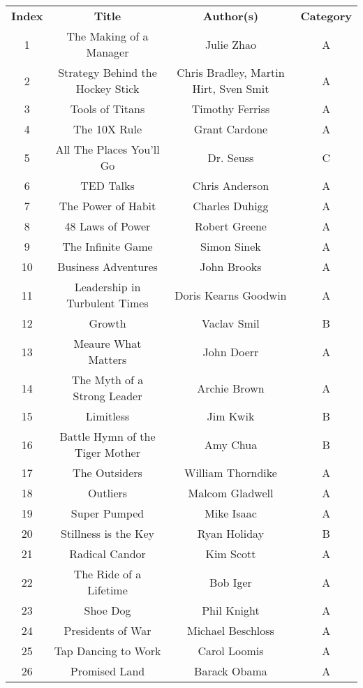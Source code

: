 \documentclass[11pt, letterpaper]{article}
\begin{document}
\begin{center}
    \begin{tabular}{ c c c c }
        \textbf{Index} & \textbf{Title} & \textbf{Author(s)} & \textbf{Category} \\ 
        1 & The Making of a Manager & Julie Zhao &  A \\  
        2 & Strategy Behind the Hockey Stick & Chris Bradley, Martin Hirt, Sven Smit & A \\
        3 & Tools of Titans & Timothy Ferriss & A \\
        4 & The 10X Rule & Grant Cardone & A \\
        5 & All The Places You'll Go & Dr. Seuss & C \\
        6 & TED Talks & Chris Anderson & A \\
        7 & The Power of Habit & Charles Duhigg & A \\
        8 & 48 Laws of Power & Robert Greene & A \\
        9 & The Infinite Game & Simon Sinek & A \\
        10 & Business Adventures & John Brooks & A \\
        11 & Leadership in Turbulent Times & Doris Kearns Goodwin & A \\
        12 & Growth & Vaclav Smil & B \\
        13 & Meaure What Matters & John Doerr & A \\
        14 & The Myth of a Strong Leader & Archie Brown & A \\
        15 & Limitless & Jim Kwik & B \\
        16 & Battle Hymn of the Tiger Mother & Amy Chua & B \\
        17 & The Outsiders & William Thorndike & A \\
        18 & Outliers & Malcom Gladwell & A \\
        19 & Super Pumped & Mike Isaac & A \\
        20 & Stillness is the Key & Ryan Holiday & B \\
        21 & Radical Candor & Kim Scott & A \\
        22 & The Ride of a Lifetime & Bob Iger & A \\
        23 & Shoe Dog & Phil Knight & A \\
        24 & Presidents of War & Michael Beschloss & A \\
        25 & Tap Dancing to Work & Carol Loomis & A \\
        26 & Promised Land & Barack Obama & A \\
    \end{tabular}
\end{center}
\end{document}
